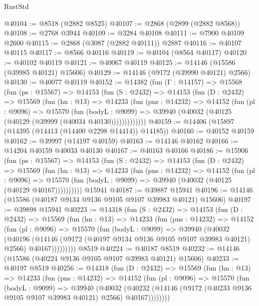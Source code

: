 \begin{lexlean}{RustStd}
\begin{coremodule}
@40104 := @8518 (@2882 @8525)
@40107 := @2868 (@2899 (@2882 @8568))
@40108 := @2768 @3944
@40109 := @3284 @40108
@40111 := @7900 @40109 @2600
@40115 := @2868 (@3087 (@2882 @40111)) @2887
@40116 := @40107 @40115
@40117 := @8566 @40116
@40119 := @40104 (@8564 @40117)
@40120 := @40102 @40119
@40121 := @40067 @40119
@40125 := @14146 (@15586 (@39985 @40121) @15606)
@40129 := @14146 (@9172 (@39990 @40121) @2566)
@40130 := @40077 @40119
@40152 := @14382
    (fun (Γ : @14157) =>
    @15568
      (fun (ps : @15567) =>
      @14153
        (fun (S : @2432) =>
        @14153
          (fun (D : @2432) =>
          @15569
            (fun (hn : @13) =>
            @14233
              (fun (pns : @14232) =>
              @14152
                (fun (pl : @9096) =>
                @15570
                  (fun (bodyL : @9099) =>
                  @39940 (@40032 (@40125 (@40129 (@39999 (@40034 @40130)))))))))))))
@40159 := @14406 (@15897 (@14395 (@14413 (@14400 @2298 @14414)) @14185))
@40160 := @40152 @40159
@40162 := @39997 (@14197 @40159)
@40163 := @14146 @40162
@40166 := @14204 @40159 @40033 @40130
@40167 := @40163 @40166
@40186 := @15906
    (fun (ps : @15567) =>
    @14153
      (fun (S : @2432) =>
      @14153
        (fun (D : @2432) =>
        @15569
          (fun (hn : @13) =>
          @14233
            (fun (pns : @14232) =>
            @14152
              (fun (pl : @9096) =>
              @15570 (fun (bodyL : @9099) => @39940 (@40032 (@40125 (@40129 @40167))))))))))
    @15941
@40187 := @39887 @15941
@40196 := @14146 (@15586 (@40187 @9134 @9136 @9105 @9107 @39983 @40121) @15606)
@40197 := @39898 @15941
@40223 := @14318
    (fun (S : @2432) =>
    @14153
      (fun (D : @2432) =>
      @15569
        (fun (hn : @13) =>
        @14233
          (fun (pns : @14232) =>
          @14152
            (fun (pl : @9096) =>
            @15570
              (fun (bodyL : @9099) =>
              @39940
                (@40032
                  (@40196
                    (@14146
                      (@9172 (@40197 @9134 @9136 @9105 @9107 @39983 @40121) @2566)
                      @40167)))))))))
    @8519
@40224 := @40187 @8519
@40232 := @14146 (@15586 (@40224 @9136 @9105 @9107 @39983 @40121) @15606)
@40233 := @40197 @8519
@40256 := @14318
    (fun (D : @2432) =>
    @15569
      (fun (hn : @13) =>
      @14233
        (fun (pns : @14232) =>
        @14152
          (fun (pl : @9096) =>
          @15570
            (fun (bodyL : @9099) =>
            @39940
              (@40032
                (@40232
                  (@14146 (@9172 (@40233 @9136 @9105 @9107 @39983 @40121) @2566) @40167))))))))

\end{coremodule}
\end{lexlean}
